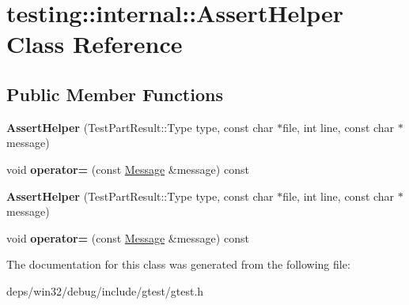 \hypertarget{classtesting_1_1internal_1_1_assert_helper}{}\section{testing\+:\+:internal\+:\+:Assert\+Helper Class Reference}
\label{classtesting_1_1internal_1_1_assert_helper}
\subsection*{Public Member Functions}
\begin{DoxyCompactItemize}
\item 
\hypertarget{classtesting_1_1internal_1_1_assert_helper_ac2c9334518fd4087189b4505567a3c90}{}{\bfseries Assert\+Helper} (Test\+Part\+Result\+::\+Type type, const char $\ast$file, int line, const char $\ast$message)\label{classtesting_1_1internal_1_1_assert_helper_ac2c9334518fd4087189b4505567a3c90}

\item 
\hypertarget{classtesting_1_1internal_1_1_assert_helper_ab721be11cb9aca8a361ca1f014ca5f80}{}void {\bfseries operator=} (const \hyperlink{classtesting_1_1_message}{Message} \&message) const \label{classtesting_1_1internal_1_1_assert_helper_ab721be11cb9aca8a361ca1f014ca5f80}

\item 
\hypertarget{classtesting_1_1internal_1_1_assert_helper_ac2c9334518fd4087189b4505567a3c90}{}{\bfseries Assert\+Helper} (Test\+Part\+Result\+::\+Type type, const char $\ast$file, int line, const char $\ast$message)\label{classtesting_1_1internal_1_1_assert_helper_ac2c9334518fd4087189b4505567a3c90}

\item 
\hypertarget{classtesting_1_1internal_1_1_assert_helper_ab721be11cb9aca8a361ca1f014ca5f80}{}void {\bfseries operator=} (const \hyperlink{classtesting_1_1_message}{Message} \&message) const \label{classtesting_1_1internal_1_1_assert_helper_ab721be11cb9aca8a361ca1f014ca5f80}

\end{DoxyCompactItemize}


The documentation for this class was generated from the following file\+:\begin{DoxyCompactItemize}
\item 
deps/win32/debug/include/gtest/gtest.\+h\end{DoxyCompactItemize}
